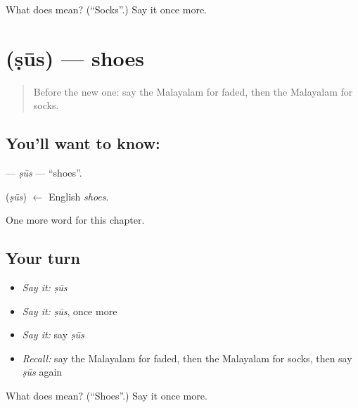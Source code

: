 \begin{tcolorbox}[breakable,colback=teal!4,colframe=teal!35!black,title={Before you move on}]
What does  mean? (\textquotedblleft{}Socks\textquotedblright{}.) Say it once more.
\end{tcolorbox}
\section[\texorpdfstring{\ml{ഷൂസ്} (ṣūs)}{ഷൂസ് (ṣūs)}]{ (ṣūs) — shoes}

\label{lesson:ML-C286-sus}



\begin{quote}
Before the new one: say the Malayalam for faded, then the Malayalam for socks.
\end{quote}

\subsection*{You'll want to know: }
\textbf{} — \emph{ṣūs} — \textquotedblleft{}shoes\textquotedblright{}.

\begin{cousinweb}
\textbf{} (\emph{ṣūs}) $\leftarrow$ English \emph{shoes}.
\end{cousinweb}

\begin{grammarlens}[title={What you've built}]
One more word for this chapter.
\end{grammarlens}

\subsection*{Your turn}
\begin{itemize}
\raggedright
  \item \emph{Say it:} \emph{ṣūs}
  \item \emph{Say it:} \emph{ṣūs}, once more
  \item \emph{Say it:} say \emph{ṣūs}
  \item \emph{Recall:} say the Malayalam for faded, then the Malayalam for socks, then say \emph{ṣūs} again
\end{itemize}

\begin{tcolorbox}[breakable,colback=teal!4,colframe=teal!35!black,title={Before you move on}]
What does  mean? (\textquotedblleft{}Shoes\textquotedblright{}.) Say it once more.
\end{tcolorbox}
